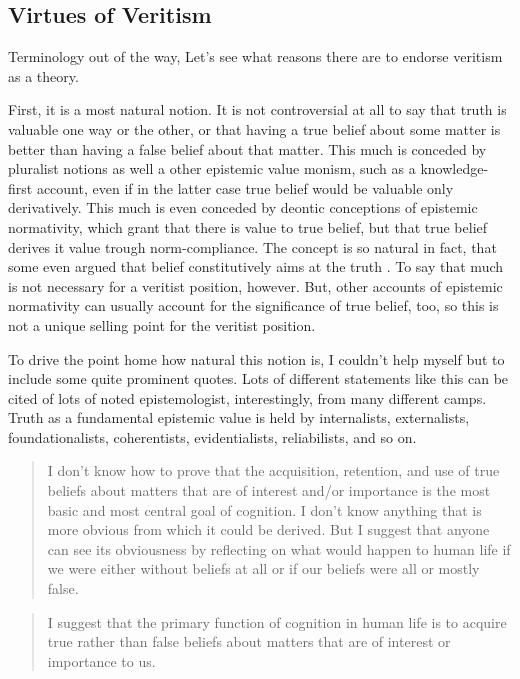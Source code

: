 \documentclass[12pt,numbers=noenddot]{scrartcl}
\begin{document}
\subsection { Virtues of Veritism }
Terminology out of the way, Let's see what reasons there are to endorse veritism as a theory.

First, it is a most natural notion. It is not controversial at all to say that truth is valuable one way or the other, or that having a true belief about some matter is better than having a false belief about that matter. This much is conceded by pluralist notions as well a other epistemic value monism, such as a knowledge-first account, even if in the latter case true belief would be valuable only derivatively. This much is even conceded by deontic conceptions of epistemic normativity, which grant that there is value to true belief, but that true belief derives it value trough norm-compliance. The concept is so natural in fact, that some even argued that belief constitutively aims at the truth \autocite{Shah2003-SHAHTG,Velleman2000-VELOTA}. To say that much is not necessary for a veritist position, however. But, other accounts of epistemic normativity can usually account for the significance of true belief, too, so this is not a unique selling point for the veritist position. 

To drive the point home how natural this notion is, I couldn't help myself but to include some quite prominent quotes. Lots of different statements like this can be cited of lots of noted epistemologist, interestingly, from many different camps. Truth as a fundamental epistemic value is held by internalists, externalists, foundationalists, coherentists, evidentialists, reliabilists, and so on.

\begin{quote}
I don't know how to prove that the acquisition, retention, and use of true beliefs about matters that are of interest and/or importance is the most basic and most central goal of cognition. I don't know anything that is more obvious from which it could be derived. But I suggest that anyone can see its obviousness by reflecting on what would happen to human life if we were either without beliefs at all or if our beliefs were all or mostly false. \textcite[30]{Alston2005-ALSBJD}
\end{quote}

\begin{quote}
 I suggest that the primary function of cognition in human life is to acquire true rather than false beliefs about matters that are of interest or importance to us. \textcite[29]{Alston2005-ALSBJD}
\end{quote}
\end{document}
